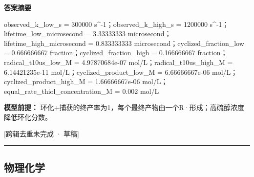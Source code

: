 \documentclass[UTF8,11pt,a4paper]{ctexart}
\begin{document}
\noindent\textbf{答案摘要}\par
observed\_k\_low\_s = 300000 s\textasciicircum{}-1；observed\_k\_high\_s = 1200000 s\textasciicircum{}-1；lifetime\_low\_microsecond = 3.33333333 microsecond；lifetime\_high\_microsecond = 0.833333333 microsecond；cyclized\_fraction\_low = 0.666666667 fraction；cyclized\_fraction\_high = 0.166666667 fraction；radical\_t10us\_low\_M = 4.97870684e-07 mol/L；radical\_t10us\_high\_M = 6.14421235e-11 mol/L；cyclized\_product\_low\_M = 6.66666667e-06 mol/L；cyclized\_product\_high\_M = 1.66666667e-06 mol/L；equal\_rate\_thiol\_concentration\_M = 0.002 mol/L\par
\noindent\textbf{模型前提：}
环化+捕获的终产率为1，每个最终产物由一个R·形成；高硫醇浓度降低环化分数。\par
\noindent\textcolor{red!65!black}{[跨辑去重未完成 · 草稿]} \par
\medskip\hrule\medskip
\subsection*{物理化学}
\end{document}
